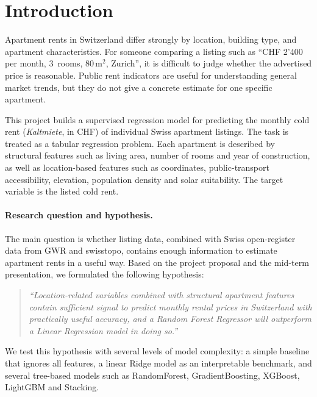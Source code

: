 \documentclass[11pt,a4paper]{article}
\begin{document}
\tableofcontents
\newpage

\section{Introduction}
\label{sec:introduction}

Apartment rents in Switzerland differ strongly by location, building type, and apartment characteristics. For someone comparing a listing such as ``CHF 2'400 per month, 3~rooms, 80\,m$^2$, Zurich'', it is difficult to judge whether the advertised price is reasonable. Public rent indicators are useful for understanding general market trends, but they do not give a concrete estimate for one specific apartment.

This project builds a supervised regression model for predicting the monthly cold rent (\emph{Kaltmiete}, in CHF) of individual Swiss apartment listings. The task is treated as a tabular regression problem. Each apartment is described by structural features such as living area, number of rooms and year of construction, as well as location-based features such as coordinates, public-transport accessibility, elevation, population density and solar suitability. The target variable is the listed cold rent.

\paragraph{Research question and hypothesis.}
The main question is whether listing data, combined with Swiss open-register data from GWR and swisstopo, contains enough information to estimate apartment rents in a useful way. Based on the project proposal and the mid-term presentation, we formulated the following hypothesis:

\begin{quote}\itshape
``Location-related variables combined with structural apartment features contain sufficient signal to predict monthly rental prices in Switzerland with practically useful accuracy, and a Random Forest Regressor will outperform a Linear Regression model in doing so.''
\end{quote}

We test this hypothesis with several levels of model complexity: a simple baseline that ignores all features, a linear Ridge model as an interpretable benchmark, and several tree-based models such as RandomForest, GradientBoosting, XGBoost, LightGBM and Stacking.
\end{document}
